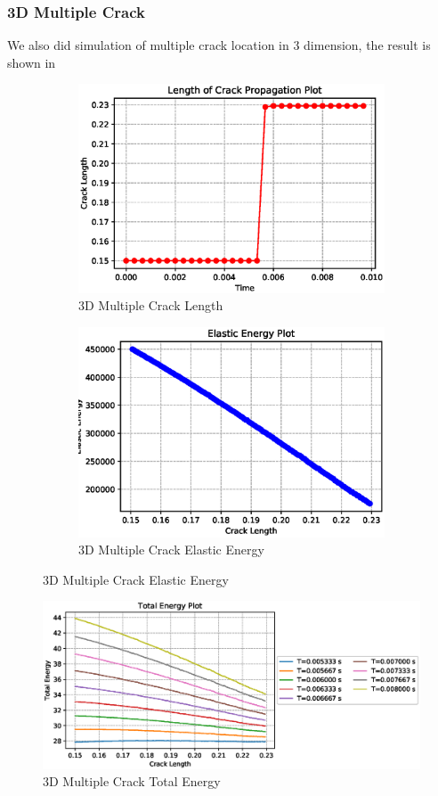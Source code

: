 \documentclass[a4paper,11pt]{article}
\begin{document}
\subsubsection{3D Multiple Crack}
We also did simulation of multiple crack location in 3 dimension, the result is shown in
\begin{figure}[h!]
	\begin{subfigure}[b]{0.49\linewidth}
	\centering
\includegraphics[width=\linewidth]{picture/conference/cracklength-multi-3d}
\caption{3D Multiple Crack Length}
\label{fig:cracklength-multi-3d}
	\end{subfigure}
	\begin{subfigure}[b]{0.49\linewidth}
	\centering
\includegraphics[width=\linewidth]{picture/conference/elastic-multi-3d}
\caption{3D Multiple Crack Elastic Energy}
\label{fig:elastic-multi-3d}
	\end{subfigure}
\end{figure}
\begin{figure}
	\centering
	\includegraphics[width=0.7\linewidth]{picture/conference/totalenergy-multi-3d}
	\caption{3D Multiple Crack Total Energy}
	\label{fig:totalenergy-multi-3d}
\end{figure}
\fi
\end{document}
